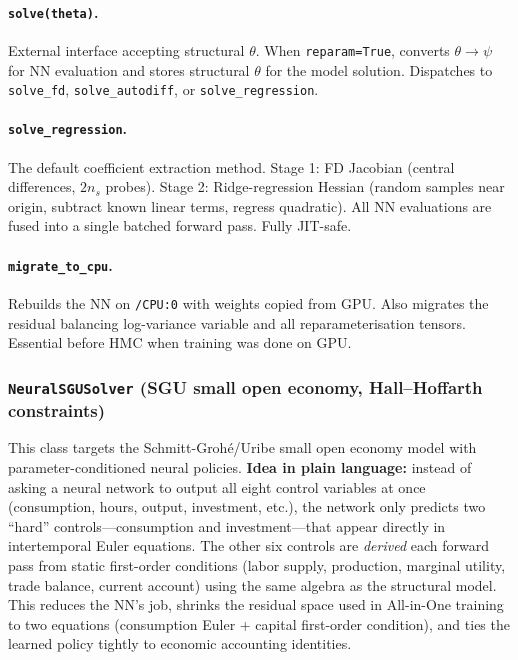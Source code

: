 \documentclass[11pt,a4paper]{article}
\theoremstyle{definition}
\newcommand{\code}[1]{\texttt{\color{codecolor}#1}}
\begin{document}
	\paragraph{\code{solve(theta)}.}
	External interface accepting structural $\theta$.
	When \code{reparam=True}, converts $\theta \to \psi$ for NN evaluation and stores structural $\theta$ for the model solution.
	Dispatches to \code{solve\_fd}, \code{solve\_autodiff}, or \code{solve\_regression}.
	
	\paragraph{\code{solve\_regression}.}
	The default coefficient extraction method.
	Stage 1: FD Jacobian (central differences, $2n_s$ probes).
	Stage 2: Ridge-regression Hessian (random samples near origin, subtract known linear terms, regress quadratic).
	All NN evaluations are fused into a single batched forward pass.
	Fully JIT-safe.
	
	\paragraph{\code{migrate\_to\_cpu}.}
	Rebuilds the NN on \code{/CPU:0} with weights copied from GPU.
	Also migrates the residual balancing log-variance variable and all reparameterisation tensors.
	Essential before HMC when training was done on GPU.
	
	
	\subsubsection{\code{NeuralSGUSolver} (SGU small open economy, Hall--Hoffarth constraints)}
	
	This class targets the Schmitt-Groh\'{e}/Uribe small open economy model with parameter-conditioned neural policies.
	\textbf{Idea in plain language:} instead of asking a neural network to output all eight control variables at once (consumption, hours, output, investment, etc.), the network only predicts two ``hard'' controls---consumption and investment---that appear directly in intertemporal Euler equations.
	The other six controls are \emph{derived} each forward pass from static first-order conditions (labor supply, production, marginal utility, trade balance, current account) using the same algebra as the structural model.
	This reduces the NN's job, shrinks the residual space used in All-in-One training to two equations (consumption Euler + capital first-order condition), and ties the learned policy tightly to economic accounting identities.
	
\end{document}
